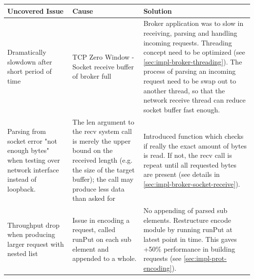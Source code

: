 \begin{table}[H]
\begin{tabular}{|p{4cm}|p{5cm}|p{6cm}|}
\hline
{\bf Uncovered Issue}                                                                                  & {\bf Cause}                                                                                                                                                                                                                 & {\bf Solution}                                                                                                                                                                                                                                                                                    \\ \hline
Dramatically slowdown after short period of time                                                       & TCP Zero Window - Socket receive buffer of broker full                                                                                                                                                                      & Broker application was to slow in receiving, parsing and handling incoming requests. Threading concept need to be optimized (see \ref{sec:impl-broker-threading}). The process of parsing an incoming request need to be swap out to another thread, so that the network receive thread can reduce socket buffer fast enough. \\ \hline
Parsing from socket error "not enough bytes"  when testing over network interface instead of loopback. & The len argument to the recv system call is merely the upper bound on the received length (e.g. the size of the target buffer); the call may produce less data than asked for & Introduced function which checks if really the exact amount of bytes is read. If not, the recv call is repeat until all requested bytes are present (see details in \ref{sec:impl-broker-socket-receive}).                                                                                                                                              \\ \hline
Throughput drop when producing larger request with nested list                                         & Issue in encoding a request, called runPut on each sub element and appended to a whole.                                                                                                                                     & No appending of parsed sub elements. Restructure encode module by running runPut at latest point in time. This gaves +50\% performance in building requests (see \ref{sec:impl-prot-encoding}).                                                                                                                                      \\ \hline

\end{tabular}
\end{table}
